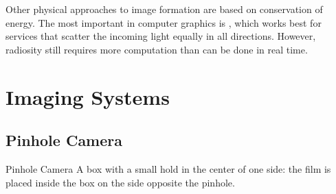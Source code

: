\documentclass[../COS3712_Notes.tex]{subfiles}
\begin{document}
        Other physical approaches to image formation are based on conservation of energy.
        The most important in computer graphics is ,
        which works best for services that scatter the incoming light equally in all directions.
        However, radiosity still requires more computation than can be done in real time.

    \section{Imaging Systems}
      \subsection{Pinhole Camera}
        \begin{definition}{Pinhole Camera}
          A box with a small hold in the center of one side:
          the film is placed inside the box on the side opposite the pinhole.
        \end{definition}
\end{document}
